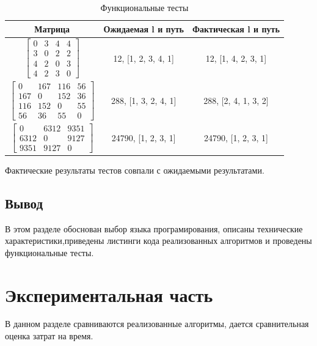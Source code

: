 \documentclass[12pt]{report}
\begin{document}
	
	\begin{table}[H]
		\caption{Функциональные тесты}
		\label{tab3}
		\begin{center}
			\begin{tabular}{ | c | c | c |}
				\hline
				\textbf{Матрица} & \textbf{Ожидаемая l и путь} & \textbf{Фактическая l и путь} \\ \hline
				$\begin{bmatrix} 
					0&3&4&4\\
					3&0&2&2\\
					4&2&0&3\\
					4&2&3&0
				\end{bmatrix}$ & 
				12, [1, 2, 3, 4, 1]
				& 
				12, [1, 4, 2, 3, 1] \\
				
				\hline
				$\begin{bmatrix} 
					0&167&116&56\\ 
					167&0&152&36 \\
					116&152&0&55\\
					56&36&55&0
				\end{bmatrix}$ & 
				288, [1, 3, 2, 4, 1]
				& 
				288, [2, 4, 1, 3, 2] \\
				
				\hline
				$\begin{bmatrix} 
					0&6312&9351\\
					6312&0&9127\\
					9351&9127&0
				\end{bmatrix}$ & 
				24790, [1, 2, 3, 1]
				& 
				24790, [1, 2, 3, 1] \\
				
				\hline
				
			\end{tabular}
			
		\end{center}
	\end{table} 
	Фактические результаты тестов совпали с ожидаемыми результатами.
	
	\section*{Вывод}
	В этом разделе обоснован выбор языка програмирования, описаны технические характеристики,приведены листинги кода реализованных алгоритмов и проведены функциональные тесты.
	\newpage
	
	\chapter{Экспериментальная часть}
	В данном разделе сравниваются реализованные алгоритмы, дается сравнительная оценка затрат на время.
	
\end{document}
